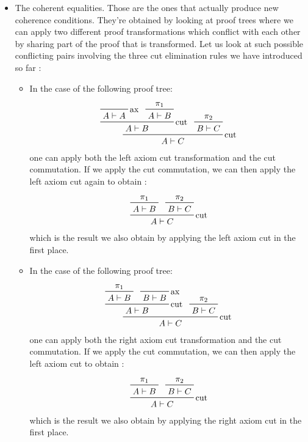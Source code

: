 \documentclass[a4paper, 12pt, twoside,openright]{report}
\begin{document}
\begin{itemize}
\item The coherent equalities. Those are the ones that actually produce new coherence conditions. They're obtained by looking at proof  trees where we can apply two different proof transformations which conflict with each other by sharing part of the proof that is transformed.  Let us look at such possible conflicting pairs involving the  three cut elimination rules we have introduced so far : 
\begin{itemize}
\item In the case of the following proof tree: 
$$\prftree[r]{cut}
	{ \prftree[r]{cut}
		{\prftree [r]{ax}{A \vdash A}
		}
		{\prftree{\pi_1}{A \vdash B}
		}
		{A \vdash B}
	}
	{\prftree{\pi_2}{B\vdash C}
	}
	{A \vdash C}
$$
one can apply both the left axiom cut transformation and the cut commutation. If we apply the cut commutation, we can then apply the left axiom cut again to obtain : 
$$
\prftree[r]{cut}
	{\prftree{\pi_1}{A \vdash B}
	}
	{\prftree{\pi_2}{B\vdash C}
	}
	{A \vdash C}	
$$
which is the result we also obtain by applying the left axiom cut in the first place. 
\item  In the case of the following proof tree: 
$$
\prftree[r]{cut}
	{ \prftree[r]{cut}
		{\prftree {\pi_1}{A \vdash B}
		}
		{\prftree[r]{ax}{B \vdash B}
		}
		{A \vdash B}
	}
	{\prftree{\pi_2}{B\vdash C}
	}
	{A \vdash C}
$$
one can apply both the right axiom cut transformation and the cut commutation. If we apply the cut commutation, we can then apply the left axiom cut  to obtain : 
$$
\prftree[r]{cut}
	{\prftree{\pi_1}{A \vdash B}
	}
	{\prftree{\pi_2}{B\vdash C}
	}
	{A \vdash C}	
$$
which is the result we also obtain by applying the right axiom cut in the first place. 


\end{itemize}
\end{itemize}
\end{document}
